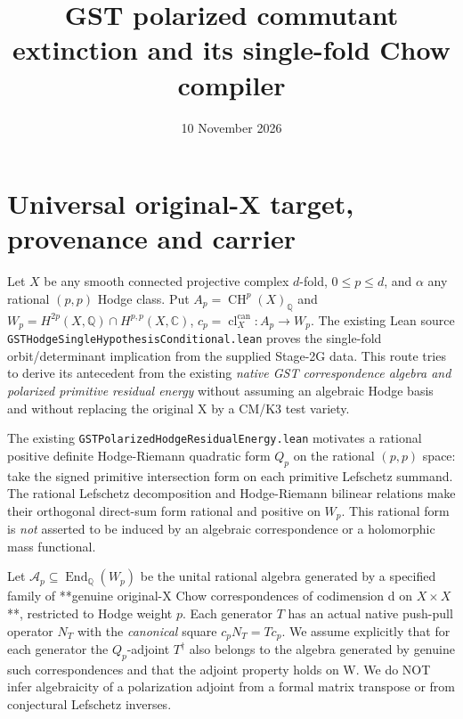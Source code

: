 \documentclass[11pt]{article}
\title{GST polarized commutant extinction and its single-fold Chow compiler}
\date{10 November 2026}
\newcommand{\Q}{\mathbb Q}
\newcommand{\CH}{\operatorname{CH}}
\newcommand{\cl}{\operatorname{cl}}
\newcommand{\End}{\operatorname{End}}
\begin{document}
\maketitle

\section{Universal original-X target, provenance and carrier}
Let $X$ be any smooth connected projective complex $d$-fold, $0\le p\le d$, and $\alpha$ any rational $(p,p)$ Hodge class. Put $A_p=\CH^p(X)_{\Q}$ and $W_p=H^{2p}(X,\Q)\cap H^{p,p}(X,\mathbb C)$, $c_p=\cl_X^{\mathrm{can}}:A_p\to W_p$. The existing Lean source \texttt{GSTHodgeSingleHypothesisConditional.lean} proves the single-fold orbit/determinant implication from the supplied Stage-2G data. This route tries to derive its antecedent from the existing \emph{native GST correspondence algebra and polarized primitive residual energy} without assuming an algebraic Hodge basis and without replacing the original X by a CM/K3 test variety.

The existing \texttt{GSTPolarizedHodgeResidualEnergy.lean} motivates a rational positive definite Hodge-Riemann quadratic form $Q_p$ on the rational $(p,p)$ space: take the signed primitive intersection form on each primitive Lefschetz summand. The rational Lefschetz decomposition and Hodge-Riemann bilinear relations make their orthogonal direct-sum form rational and positive on $W_p$. This rational form is \emph{not} asserted to be induced by an algebraic correspondence or a holomorphic mass functional.

Let $\mathcal A_p\subseteq\End_\Q(W_p)$ be the unital rational algebra generated by a specified family of **genuine original-X Chow correspondences of codimension d on $X\times X$**, restricted to Hodge weight $p$. Each generator $T$ has an actual native push-pull operator $N_T$ with the \emph{canonical} square $c_pN_T=T c_p$. We assume explicitly that for each generator the $Q_p$-adjoint $T^\dagger$ also belongs to the algebra generated by genuine such correspondences and that the adjoint property holds on W. We do NOT infer algebraicity of a polarization adjoint from a formal matrix transpose or from conjectural Lefschetz inverses.
\end{document}
